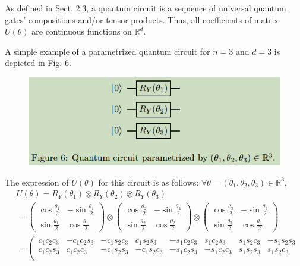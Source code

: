 As defined in Sect. 2.3, a quantum circuit is a sequence of universal quantum gates' compositions and/or tensor products. Thus, all coefficients of matrix $U(\theta)$ are continuous functions on $\mathbb{R}^{d}$.

\begin{example}
    A simple example of a parametrized quantum circuit for $n=3$ and $d=3$ is depicted in Fig. 6.
\begin{figure}[ht]
    \centering
    \includegraphics[width=0.75\linewidth]{Images/parametrized-quantum-circuit.png}
\end{figure}
The expression of $U(\theta)$ for this circuit is as follows: $\forall \theta=\left(\theta_1, \theta_2, \theta_3\right) \in \mathbb{R}^3$,
\begin{equation}
\begin{aligned}
& U(\theta)=R_Y\left(\theta_1\right) \otimes R_Y\left(\theta_2\right) \otimes R_Y\left(\theta_3\right) \\
& =\left(\begin{array}{cc}
\cos \frac{\theta_1}{2} & -\sin \frac{\theta_1}{2} \\
\sin \frac{\theta_1}{2} & \cos \frac{\theta_1}{2}
\end{array}\right) \otimes\left(\begin{array}{cc}
\cos \frac{\theta_2}{2} & -\sin \frac{\theta_2}{2} \\
\sin \frac{\theta_2}{2} & \cos \frac{\theta_2}{2}
\end{array}\right) \otimes\left(\begin{array}{cc}
\cos \frac{\theta_3}{2} & -\sin \frac{\theta_3}{2} \\
\sin \frac{\theta_3}{2} & \cos \frac{\theta_3}{2}
\end{array}\right) \\
& =\left(\begin{array}{cccccccc}
c_1 c_2 c_3 & -c_1 c_2 s_3 & -c_1 s_2 c_3 & c_1 s_2 s_3 & -s_1 c_2 c_3 & s_1 c_2 s_3 & s_1 s_2 c_3 & -s_1 s_2 s_3 \\
c_1 c_2 s_3 & c_1 c_2 c_3 & -c_1 s_2 s_3 & -c_1 s_2 c_3 & -s_1 c_2 s_3 & -s_1 c_2 c_3 & s_1 s_2 s_3 & s_1 s_2 c_3 \\

\end{array}
\end{aligned}
\end{equation}
\end{example}
